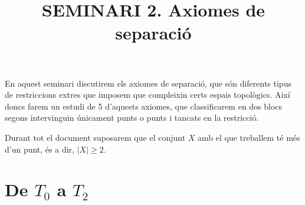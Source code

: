 \documentclass[10pt,a4paper]{article}
\title{\bfseries\Large SEMINARI 2. Axiomes de separació}
\author{}
\date{\parbox{\linewidth}{\centering
  Topologia\endgraf
  Grau en Matemàtiques\endgraf
  Universitat Autònoma de Barcelona\endgraf
  Octubre de 2021}}
\theoremstyle{definition}
\begin{document}
\maketitle
En aquest seminari discutirem els axiomes de separació, que són diferents tipus de restriccions extres que imposem que compleixin certs espais topològics. Així doncs farem un estudi de 5 d'aquests axiomes, que classificarem en dos blocs segons intervinguin únicament punts o punts i tancats en la restricció.

Durant tot el document suposarem que el conjunt $X$ amb el que treballem té més d'un punt, és a dir, $|X|\geq 2$.
\section{De \texorpdfstring{$T_0$}{T0} a \texorpdfstring{$T_2$}{T2}}
\end{document}
